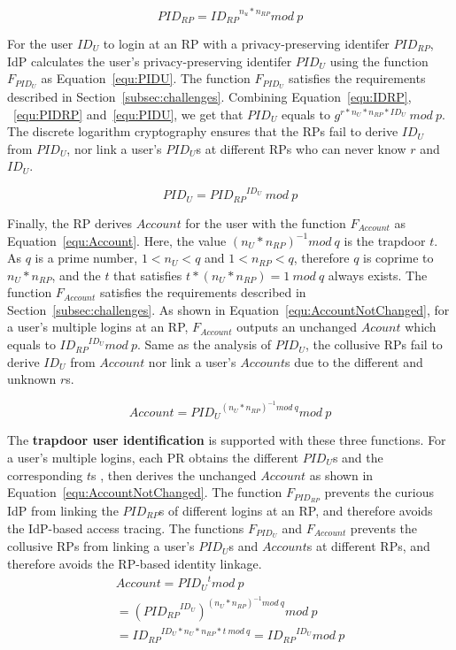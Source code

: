  \begin{equation}
    PID_{RP} = {ID_{RP}}^{n_{u}* n_{RP}} mod \ p
   \label{equ:PIDRP}
   \end{equation}

For the user $ID_U$ to login at an RP with a privacy-preserving identifer $PID_{RP}$, IdP calculates the user's privacy-preserving identifer $PID_U$ using the function  $F_{PID_{U}}$ as Equation~\ref{equ:PIDU}. The function $F_{PID_{U}}$ satisfies the requirements described in Section~\ref{subsec:challenges}.
Combining Equation~\ref{equ:IDRP}, ~\ref{equ:PIDRP} and~\ref{equ:PIDU}, we get that  $PID_U$ equals to $g^{r*n_U*n_{RP}*ID_U}\ mod \ p$.
The discrete logarithm cryptography ensures that the RPs fail to derive $ID_U$ from $PID_U$,
nor link a user's $PID_U$s at different RPs who can never  know $r$ and $ID_U$. %


\begin{equation}
 PID_U = {PID_{RP}}^{ID_U} \ mod \ p
 \label{equ:PIDU}
\end{equation}

Finally, the RP derives $Account$ for the user with the function $F_{Account}$ as Equation~\ref{equ:Account}. Here, the value $(n_U*n_{RP})^{-1} mod \ q$ is the trapdoor $t$. As $q$ is a prime number, $1< n_U < q$ and $1< n_{RP} < q$, therefore $q$ is coprime to $n_U*n_{RP}$, and the $t$ that satisfies $t*(n_U*n_{RP}) = 1\ mod \ q$ always exists. The function $F_{Account}$ satisfies the requirements described in Section~\ref{subsec:challenges}.  As shown in Equation~\ref{equ:AccountNotChanged},  for a user's multiple logins at an RP, $F_{Account}$ outputs an unchanged $Acount$  which equals to ${{ID_{RP}}^{ID_U}} mod \ p$.
Same as the analysis of $PID_U$, the collusive RPs fail to derive $ID_U$ from $Account$ nor link a user's $Account$s due to the different and unknown $r$s.

 \begin{equation}
   Account = {PID_U}^{(n_U*n_{RP})^{-1} mod \ q} mod \ p
   \label{equ:Account}
   \end{equation}

The \textbf{trapdoor user identification} is supported with these three functions.
For a user's multiple logins, each PR obtains the different $PID_U$s and the corresponding $t$s , then derives the unchanged $Account$  as shown in Equation~\ref{equ:AccountNotChanged}.
The function $F_{PID_{RP}}$ prevents the curious IdP from linking the $PID_{RP}$s of different logins at an RP, and therefore avoids  the  IdP-based access tracing.
The functions $F_{PID_{U}}$ and $F_{Account}$ prevents the collusive RPs from linking a user's $PID_U$s and $Account$s at different RPs, and therefore avoids the RP-based identity linkage.
 \begin{multline}\label{equ:AccountNotChanged}
   Account =  {PID_{U}}^{t} mod \ p  \\
   = {({PID_{RP}}^{ID_U})}^{{(n_U*n_{RP})^{-1} mod \ q}} mod \ p \\
   = {ID_{RP}} ^ {ID_U * n_U * n_{RP} *t\ mod\ q} = {ID_{RP}}^{ID_U} mod \ p
 \end{multline}

